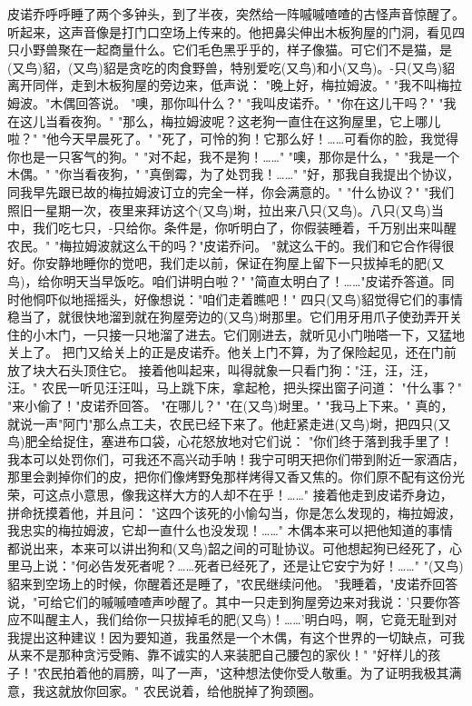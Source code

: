 \documentclass[12pt,UTF8]{ctexbook}
\begin{document}
皮诺乔呼呼睡了两个多钟头，到了半夜，突然给一阵嘁嘁喳喳的古怪声音惊醒了。听起来，这声音像是打门口空场上传来的。他把鼻尖伸出木板狗屋的门洞，看见四只小野兽聚在一起商量什么。它们毛色黑乎乎的，样子像猫。可它们不是猫，是(又鸟)貂，(又鸟)貂是贪吃的肉食野兽，特别爱吃(又鸟)和小(又鸟)。-只(又鸟)貂离开同伴，走到木板狗屋的旁边来，低声说：
"晚上好，梅拉姆波。"
"我不叫梅拉姆波。"木偶回答说。
"噢，那你叫什么？"
"我叫皮诺乔。"
"你在这儿干吗？"
"我在这儿当看夜狗。"
"那么，梅拉姆波呢？这老狗一直住在这狗屋里，它上哪儿啦？"
"他今天早晨死了。"
"死了，可怜的狗！它那么好！……可看你的脸，我觉得你也是一只客气的狗。"
"对不起，我不是狗！……"
"噢，那你是什么，"
"我是一个木偶。"
"你当看夜狗，"
"真倒霉，为了处罚我！……"
"好，那我自我提出个协议，同我早先跟已故的梅拉姆波订立的完全一样，你会满意的。"
"什么协议？"
"我们照旧一星期一次，夜里来拜访这个(又鸟)埘，拉出来八只(又鸟)。八只(又鸟)当中，我们吃七只，-只给你。条件是，你听明白了，你假装睡着，千万别出来叫醒农民。"
"梅拉姆波就这么干的吗？"皮诺乔问。
"就这么干的。我们和它合作得很好。你安静地睡你的觉吧，我们走以前，保证在狗屋上留下一只拔掉毛的肥(又鸟)，给你明天当早饭吃。咱们讲明白啦？"
"简直太明白了！……"皮诺乔答道。同时他恫吓似地摇摇头，好像想说："咱们走着瞧吧！"
四只(又鸟)貂觉得它们的事情稳当了，就很快地溜到就在狗屋旁边的(又鸟)埘那里。它们用牙用爪子使劲弄开关住的小木门，一只接一只地溜了进去。它们刚进去，就听见小门啪嗒一下，又猛地关上了。
把门又给关上的正是皮诺乔。他关上门不算，为了保险起见，还在门前放了块大石头顶住它。
接着他叫起来，叫得就象一只看门狗："汪，汪，汪，汪。"
农民一听见汪汪叫，马上跳下床，拿起枪，把头探出窗子问道：
"什么事？"
"来小偷了！"皮诺乔回答。
"在哪儿？"
"在(又鸟)埘里。"
"我马上下来。"
真的，就说一声"阿门"那么点工夫，农民已经下来了。他赶紧走进(又鸟)埘，把四只(又鸟)肥全给捉住，塞进布口袋，心花怒放地对它们说：
"你们终于落到我手里了！我本可以处罚你们，可我还不高兴动手呐！我宁可明天把你们带到附近一家酒店，那里会剥掉你们的皮，把你们像烤野兔那样烤得又香又焦的。你们原不配有这份光荣，可这点小意思，像我这样大方的人却不在乎！……"
接着他走到皮诺乔身边，拼命抚摸着他，并且问：
"这四个该死的小愉勾当，你是怎么发现的，梅拉姆波，我忠实的梅拉姆波，它却一直什么也没发现！……"
木偶本来可以把他知道的事情都说出来，本来可以讲出狗和(又鸟)韶之间的可耻协议。可他想起狗已经死了，心里马上说："何必告发死者呢？……死者已经死了，还是让它安宁为好！……"
"(又鸟)貂来到空场上的时候，你醒着还是睡了，"农民继续问他。
"我睡着，"皮诺乔回答说，"可给它们的嘁嘁喳喳声吵醒了。其中一只走到狗屋旁边来对我说：'只要你答应不叫醒主人，我们给你一只拔掉毛的肥(又鸟)！……'明白吗，啊，它竟无耻到对我提出这种建议！因为要知道，我虽然是一个木偶，有这个世界的一切缺点，可我从来不是那种贪污受贿、靠不诚实的人来装肥自己腰包的家伙！"
"好样儿的孩子！"农民拍着他的肩膀，叫了一声，"这种想法使你受人敬重。为了证明我极其满意，我这就放你回家。"
农民说着，给他脱掉了狗颈圈。
\end{document}
